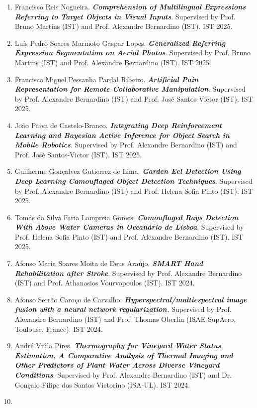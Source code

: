 \begin{enumerate}
\item
  Francisco Reis Nogueira. \emph{\textbf{Comprehension of Multilingual
  Expressions Referring to Target Objects in Visual Inputs}}. Supervised
  by Prof. Bruno Martins (IST) and Prof. Alexandre Bernardino (IST). IST
  2025.
\item
  Luís Pedro Soares Marmoto Gaspar Lopes. \emph{\textbf{Generalized
  Referring Expression Segmentation on Aerial Photos}}. Supervised by
  Prof. Bruno Martins (IST) and Prof. Alexandre Bernardino (IST). IST
  2025.
\item
  Francisco Miguel Pessanha Pardal Ribeiro. \emph{\textbf{Artificial
  Pain Representation for Remote Collaborative Manipulation}}.
  Supervised by Prof. Alexandre Bernardino (IST) and Prof. José
  Santos-Victor (IST). IST 2025.
\item
  João Paiva de Castelo-Branco. \emph{\textbf{Integrating Deep
  Reinforcement Learning and Bayesian Active Inference for Object Search
  in Mobile Robotics}}. Supervised by Prof. Alexandre Bernardino (IST)
  and Prof. José Santos-Victor (IST). IST 2025.
\item
  Guilherme Gonçalvez Gutierrez de Lima. \emph{\textbf{Garden Eel
  Detection Using Deep Learning Camouflaged Object Detection
  Techniques}}. Supervised by Prof. Alexandre Bernardino (IST) and Prof.
  Helena Sofia Pinto (IST). IST 2025.
\item
  Tomás da Silva Faria Lampreia Gomes. \emph{\textbf{Camouflaged Rays
  Detection With Above Water Cameras in Oceanário de Lisboa}}.
  Supervised by Prof. Helena Sofia Pinto (IST) and Prof. Alexandre
  Bernardino (IST). IST 2025.
\item
  Afonso Maria Soares Moita de Deus Araújo. \emph{\textbf{SMART Hand
  Rehabilitation after Stroke}}. Supervised by Prof. Alexandre
  Bernardino (IST) and Prof. Athanasios Vourvopoulos (IST). IST 2024.
\item
  Afonso Serrão Caroço de Carvalho.
  \emph{\textbf{Hyperspectral/multiespectral image fusion with a neural
  network regularization.}} Supervised by Prof. Alexandre Bernardino
  (IST) and Prof. Thomas Oberlin (ISAE-SupAero, Toulouse, France). IST
  2024.
\item
  André Viúla Pires. \emph{\textbf{Thermography for Vineyard Water
  Status Estimation, A Comparative Analysis of Thermal Imaging and Other
  Predictors of Plant Water Across Diverse Vineyard Conditions}}.
  Supervised by Prof. Alexandre Bernardino (IST) and Dr. Gonçalo Filipe
  dos Santos Victorino (ISA-UL). IST 2024.
\item

\end{enumerate}

